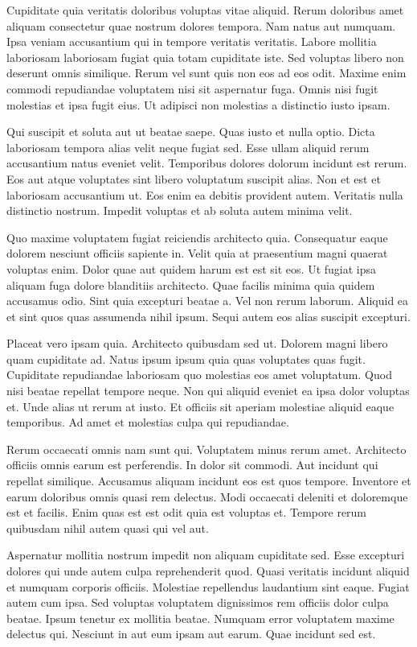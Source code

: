 Cupiditate quia veritatis doloribus voluptas vitae aliquid. Rerum doloribus amet aliquam consectetur quae nostrum dolores tempora. Nam natus aut numquam. Ipsa veniam accusantium qui in tempore veritatis veritatis. Labore mollitia laboriosam laboriosam fugiat quia totam cupiditate iste. Sed voluptas libero non deserunt omnis similique. Rerum vel sunt quis non eos ad eos odit. Maxime enim commodi repudiandae voluptatem nisi sit aspernatur fuga. Omnis nisi fugit molestias et ipsa fugit eius. Ut adipisci non molestias a distinctio iusto ipsam.

Qui suscipit et soluta aut ut beatae saepe. Quas iusto et nulla optio. Dicta laboriosam tempora alias velit neque fugiat sed. Esse ullam aliquid rerum accusantium natus eveniet velit. Temporibus dolores dolorum incidunt est rerum. Eos aut atque voluptates sint libero voluptatum suscipit alias. Non et est et laboriosam accusantium ut. Eos enim ea debitis provident autem. Veritatis nulla distinctio nostrum. Impedit voluptas et ab soluta autem minima velit.

Quo maxime voluptatem fugiat reiciendis architecto quia. Consequatur eaque dolorem nesciunt officiis sapiente in. Velit quia at praesentium magni quaerat voluptas enim. Dolor quae aut quidem harum est est sit eos. Ut fugiat ipsa aliquam fuga dolore blanditiis architecto. Quae facilis minima quia quidem accusamus odio. Sint quia excepturi beatae a. Vel non rerum laborum. Aliquid ea et sint quos quas assumenda nihil ipsum. Sequi autem eos alias suscipit excepturi.

Placeat vero ipsam quia. Architecto quibusdam sed ut. Dolorem magni libero quam cupiditate ad. Natus ipsum ipsum quia quas voluptates quas fugit. Cupiditate repudiandae laboriosam quo molestias eos amet voluptatum. Quod nisi beatae repellat tempore neque. Non qui aliquid eveniet ea ipsa dolor voluptas et. Unde alias ut rerum at iusto. Et officiis sit aperiam molestiae aliquid eaque temporibus. Ad amet et molestias culpa qui repudiandae.

Rerum occaecati omnis nam sunt qui. Voluptatem minus rerum amet. Architecto officiis omnis earum est perferendis. In dolor sit commodi. Aut incidunt qui repellat similique. Accusamus aliquam incidunt eos est quos tempore. Inventore et earum doloribus omnis quasi rem delectus. Modi occaecati deleniti et doloremque est et facilis. Enim quas est est odit quia est voluptas et. Tempore rerum quibusdam nihil autem quasi qui vel aut.

Aspernatur mollitia nostrum impedit non aliquam cupiditate sed. Esse excepturi dolores qui unde autem culpa reprehenderit quod. Quasi veritatis incidunt aliquid et numquam corporis officiis. Molestiae repellendus laudantium sint eaque. Fugiat autem cum ipsa. Sed voluptas voluptatem dignissimos rem officiis dolor culpa beatae. Ipsum tenetur ex mollitia beatae. Numquam error voluptatem maxime delectus qui. Nesciunt in aut eum ipsam aut earum. Quae incidunt sed est.

